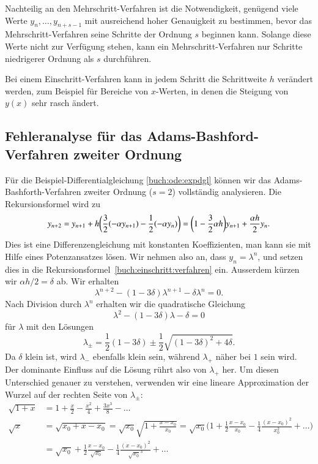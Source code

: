 Nachteilig an den Mehrschritt-Verfahren ist die Notwendigkeit,
genügend viele Werte $y_{n},\dots,y_{n+s-1}$ mit ausreichend
hoher Genauigkeit zu bestimmen, bevor das Mehrschritt-Verfahren
seine Schritte der Ordnung $s$ beginnen kann.
Solange diese Werte nicht zur Verfügung stehen, kann ein Mehrschritt-Verfahren
nur Schritte niedrigerer Ordnung als $s$ durchführen.

Bei einem Einschritt-Verfahren kann in jedem Schritt die Schrittweite $h$
verändert werden, zum Beispiel für Bereiche von $x$-Werten, in denen
die Steigung von $y(x)$ sehr rasch ändert.

\subsection{Fehleranalyse für das Adams-Bashford-Verfahren zweiter Ordnung
\label{buch:ode:subsection:fehleranalyse}}
Für die Beispiel-Differentialgleichung \eqref{buch:ode:expdgl} können
wir das Adams-Bashforth-Verfahren zweiter Ordnung ($s=2$) vollständig
analysieren.
Die Rekursionsformel wird zu
\begin{equation}
y_{n+2}=y_{n+1}+h\biggl(\frac32 (-\alpha y_{n+1})-\frac12(-\alpha y_n)\biggr)
=
\biggl(1-\frac32\alpha h\biggr)
y_{n+1}
+\frac{\alpha h}{2}
y_{n\mathstrut}.
\label{buch:einschritt:verfahren}
\end{equation}
Dies ist eine Differenzengleichung mit konstanten Koeffizienten, man kann
sie mit Hilfe eines Potenzansatzes lösen. 
Wir nehmen also an, dass $y_n=\lambda^n$, und setzen dies in die
Rekursionsformel~\eqref{buch:einschritt:verfahren} ein.
Ausserdem kürzen wir $\alpha h/2=\delta$  ab.
Wir erhalten
\[
\lambda^{n+2}-(1-3\delta)\lambda^{n+1}-\delta\lambda^n=0.
\]
Nach Division durch $\lambda^n$ erhalten wir die quadratische Gleichung
\[
\lambda^2-(1-3\delta )\lambda-\delta=0
\]
für $\lambda$ mit den Lösungen
\[
\lambda_\pm
=
\frac12(1-3\delta) \pm \frac12\sqrt{(1-3\delta)^2+4\delta}.
\]
Da $\delta$ klein ist, wird $\lambda_-$ ebenfalls klein sein,
während $\lambda_+$ näher bei $1$ sein wird.
Der dominante Einfluss auf die Lösung rührt also von $\lambda_+$ her.
Um diesen Unterschied genauer zu verstehen, verwenden wir eine
lineare Approximation der Wurzel auf der rechten Seite von $\lambda_\pm$:
\begin{align*}
\sqrt{1+x}
&=
1+\frac{x}{2}-\frac{x^2}{4}+\frac{3x^3}{8}-\dots
\\
\sqrt{x}
&=
\sqrt{x_0+x-x_0}
=
\sqrt{x_0}\sqrt{1+\frac{x-x_0}{x_0}}
=
\sqrt{x_0}\biggl(1+\frac12\frac{x-x_0}{x_0}-\frac14\frac{(x-x_0)^2}{x_0^2}+\dots\biggr)
\\
&=
\sqrt{x_0}+\frac12\frac{x-x_0}{\sqrt{x_0}}-\frac14\frac{(x-x_0)^2}{\sqrt{x_0}^3}+\dots
\end{align*}
